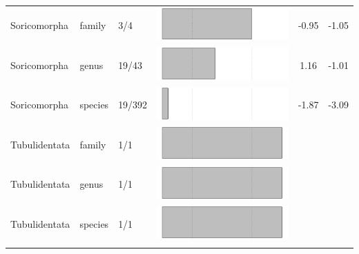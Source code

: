 \begin{longtable}{lL{1.8cm}C{2cm}lcc}
  Soricomorpha & family & 3/4 & \includegraphics[width=0.20\linewidth, height=0.05\linewidth]{Table_figures/bar79.pdf} & -0.95 & -1.05 \\ 
  Soricomorpha & genus & 19/43 & \includegraphics[width=0.20\linewidth, height=0.05\linewidth]{Table_figures/bar80.pdf} & 1.16 & -1.01 \\ 
  Soricomorpha & species & 19/392 & \includegraphics[width=0.20\linewidth, height=0.05\linewidth]{Table_figures/bar81.pdf} & -1.87 & -3.09 \\ 
  Tubulidentata & family & 1/1 & \includegraphics[width=0.20\linewidth, height=0.05\linewidth]{Table_figures/bar82.pdf} &   &   \\ 
  Tubulidentata & genus & 1/1 & \includegraphics[width=0.20\linewidth, height=0.05\linewidth]{Table_figures/bar83.pdf} &   &   \\ 
  Tubulidentata & species & 1/1 & \includegraphics[width=0.20\linewidth, height=0.05\linewidth]{Table_figures/bar84.pdf} &   &   \\ 
   \hline
\hline
\label{Tab_test}
\end{longtable}
